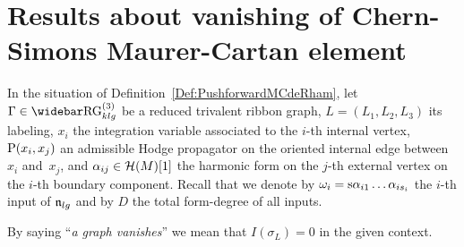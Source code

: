 \documentclass[\MainFolder/Text.tex]{subfiles}
\begin{document}
\section{Results about vanishing of Chern-Simons Maurer-Cartan element}
\label{Sec:Vanishing}


In the situation of Definition~\ref{Def:PushforwardMCdeRham}, let $\Gamma \in \TRRG_{klg}$ be a reduced trivalent ribbon graph, $L=(L_1,L_2,L_3)$ its labeling, $x_i$ the integration variable associated to the $i$-th internal vertex, $\mathrm{P}(x_i,x_j)$ an admissible Hodge propagator on the oriented internal edge between $x_i$ and~$x_j$, and $\alpha_{ij}\in \mathcal{H}(M)[1]$ the harmonic form on the $j$-th external vertex on the $i$-th boundary component. Recall that we denote by $\omega_i = \mathrm{s} \alpha_{i1}\dotsc\alpha_{is_i}$ the $i$-th input of $\mathfrak{n}_{lg}$ and by $D$ the total form-degree of all inputs. 

By saying ``\emph{a graph vanishes}'' we mean that $I(\sigma_L) = 0$ in the given context.
\end{document}
